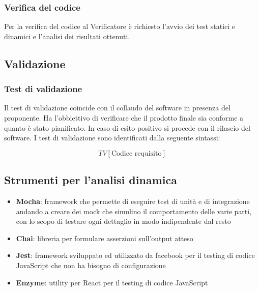 \subsubsection{Verifica del codice} 
Per la verifica del codice al Verificatore è richiesto l'avvio dei test statici e dinamici e l'analisi dei risultati ottenuti.


\subsection{Validazione}

\subsubsection{Test di validazione}
Il test di validazione coincide con il collaudo del software in
presenza del proponente. Ha l'obbiettivo di verificare che il prodotto finale sia conforme a quanto è stato pianificato. In caso di esito positivo si procede con il
rilascio del software. I test di validazione sono identificati dalla
seguente sintassi: 

$$ TV[\text{Codice requisito}] $$


\subsection{Strumenti per l'analisi dinamica}

\begin{itemize}
	\item \textbf{Mocha}: framework che permette di eseguire test di unità e di integrazione andando a creare dei mock che simulino il comportamento delle varie parti, con lo scopo di testare ogni dettaglio in modo indipendente dal resto
	\item \textbf{Chai}: libreria per formulare asserzioni sull'output atteso
	\item \textbf{Jest}: framework sviluppato ed utilizzato da facebook per il testing di codice JavaScript che non ha bisogno di configurazione
	\item \textbf{Enzyme}: utility per React per il testing di codice JavaScript
\end{itemize}

